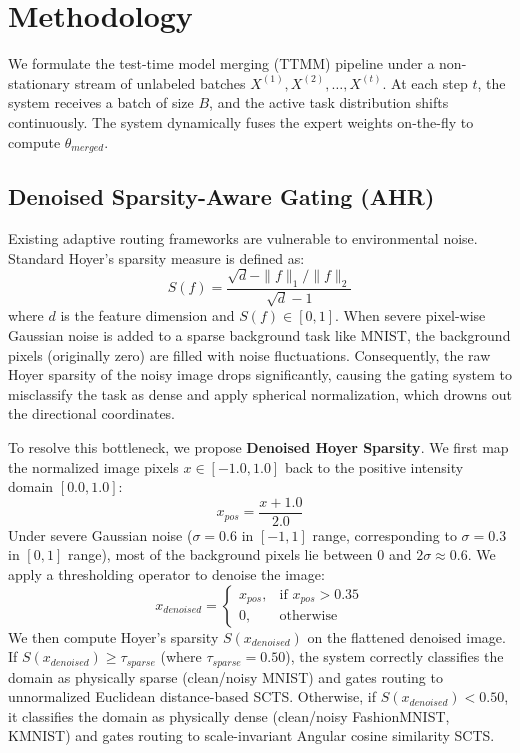 \documentclass{article}
\theoremstyle{plain}
\theoremstyle{definition}
\theoremstyle{remark}
\begin{document}
\section{Methodology}
\label{sec:method}

We formulate the test-time model merging (TTMM) pipeline under a non-stationary stream of unlabeled batches $X^{(1)}, X^{(2)}, \dots, X^{(t)}$. At each step $t$, the system receives a batch of size $B$, and the active task distribution shifts continuously. The system dynamically fuses the expert weights on-the-fly to compute $\theta_{merged}$.

\subsection{Denoised Sparsity-Aware Gating (AHR)}
Existing adaptive routing frameworks are vulnerable to environmental noise. Standard Hoyer's sparsity measure \cite{hoyer2004non} is defined as:
\begin{equation}
  S(f) = \frac{\sqrt{d} - \|f\|_1 / \|f\|_2}{\sqrt{d} - 1}
\end{equation}
where $d$ is the feature dimension and $S(f) \in [0, 1]$. When severe pixel-wise Gaussian noise is added to a sparse background task like MNIST, the background pixels (originally zero) are filled with noise fluctuations. Consequently, the raw Hoyer sparsity of the noisy image drops significantly, causing the gating system to misclassify the task as dense and apply spherical normalization, which drowns out the directional coordinates.

To resolve this bottleneck, we propose \textbf{Denoised Hoyer Sparsity}. We first map the normalized image pixels $x \in [-1.0, 1.0]$ back to the positive intensity domain $[0.0, 1.0]$:
\begin{equation}
  x_{pos} = \frac{x + 1.0}{2.0}
\end{equation}
Under severe Gaussian noise ($\sigma = 0.6$ in $[-1, 1]$ range, corresponding to $\sigma = 0.3$ in $[0, 1]$ range), most of the background pixels lie between $0$ and $2\sigma \approx 0.6$. We apply a thresholding operator to denoise the image:
\begin{equation}
  x_{denoised} = \begin{cases}
    x_{pos}, & \text{if } x_{pos} > 0.35 \\
    0, & \text{otherwise}
  \end{cases}
\end{equation}
We then compute Hoyer's sparsity $S(x_{denoised})$ on the flattened denoised image. If $S(x_{denoised}) \ge \tau_{sparse}$ (where $\tau_{sparse} = 0.50$), the system correctly classifies the domain as physically sparse (clean/noisy MNIST) and gates routing to unnormalized Euclidean distance-based SCTS. Otherwise, if $S(x_{denoised}) < 0.50$, it classifies the domain as physically dense (clean/noisy FashionMNIST, KMNIST) and gates routing to scale-invariant Angular cosine similarity SCTS.
\end{document}

